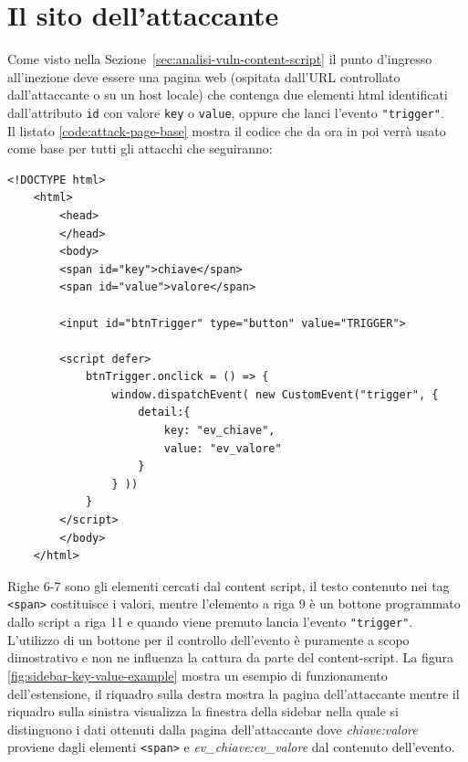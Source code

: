 \documentclass{sapthesis}
\newcommand{\code}[1]{\texttt{#1}}
\newcommand{\refSection}[1]{Sezione~\ref{#1}}
\begin{document}
    \section{Il sito dell'attaccante}
    \label{sec:attaccando-vuln-sito}
        Come visto nella \refSection{sec:analisi-vuln-content-script} il punto d'ingresso all'inezione
        deve essere una pagina web (ospitata dall'URL controllato dall'attaccante o su un host locale)
        che contenga due elementi html identificati dall'attributo \code{id} con valore \code{key} o
        \code{value}, oppure che lanci l'evento \code{"trigger"}.\\
        Il listato \ref{code:attack-page-base} mostra il codice che da ora in poi verrà usato come base per tutti gli attacchi
        che seguiranno:
        \begin{lstlisting}[caption={codice html della pagina di attacco}, captionpos=b, label={code:attack-page-base}]
    <!DOCTYPE html>
    <html>
        <head>
        </head>
        <body>
        <span id="key">chiave</span>
        <span id="value">valore</span>
        
        <input id="btnTrigger" type="button" value="TRIGGER">
    
        <script defer>
            btnTrigger.onclick = () => {
                window.dispatchEvent( new CustomEvent("trigger", {
                    detail:{
                        key: "ev_chiave", 
                        value: "ev_valore" 
                    }
                } ))
            }
        </script>
        </body>
    </html>
        \end{lstlisting}
        Righe 6-7 sono gli elementi cercati dal content script, il testo contenuto nei tag \code{<span>}
        costituisce i valori, mentre l'elemento a riga 9 è un bottone programmato dallo script a riga 11
        e quando viene premuto lancia l'evento \code{"trigger"}. L'utilizzo di un bottone per il
        controllo dell'evento è puramente a scopo dimostrativo e non ne influenza la cattura da parte
        del content-script.
        La figura \ref{fig:sidebar-key-value-example} mostra un esempio di funzionamento dell'estensione,
        il riquadro sulla destra mostra la pagina dell'attaccante mentre il riquadro sulla sinistra visualizza 
        la finestra della sidebar nella quale si distinguono
        i dati ottenuti dalla pagina dell'attaccante dove \textit{chiave:valore} proviene dagli
        elementi \code{<span>} e \textit{ev\_chiave:ev\_valore} dal contenuto dell'evento.
\end{document}
